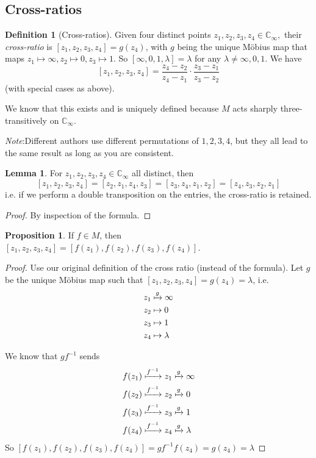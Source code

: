 \documentclass[a4paper]{article}
\theoremstyle{definition}
\newtheorem*{prop}{Proposition}
\newtheorem*{defi}{Definition}
\newtheorem*{lemma}{Lemma}
\newcommand{\note}{\noindent \emph{Note}:\;}
\newcommand{\C}{\mathbb{C}}
\begin{document}
\subsection{Cross-ratios}
\begin{defi}[Cross-ratios]
  Given four distinct points $z_1, z_2, z_3, z_4\in \C_\infty,$ their \emph{cross-ratio} is $[z_1, z_2, z_3, z_4] = g(z_4)$, with $g$ being the unique M\"obius map that maps $z_1\mapsto \infty, z_2\mapsto 0, z_3\mapsto 1$.  So $[\infty, 0, 1, \lambda] = \lambda$ for any $\lambda\not= \infty, 0, 1$. We have
  \[
  [z_1, z_2, z_3, z_4] = \frac{z_4 - z_2}{z_4 - z_1} \cdot \frac{z_3 - z_1}{z_3 - z_2}
  \]
(with special cases as above).
\end{defi}
We know that this exists and is uniquely defined because $M$ acts sharply three-transitively on $\C_\infty$.

\note Different authors use different permutations of $1, 2, 3, 4$, but they all lead to the same result as long as you are consistent.

\begin{lemma}
  For $z_1, z_2, z_3, z_4\in \C_\infty$ all distinct, then
  \[
  [z_1, z_2, z_3, z_4] = [z_2, z_1, z_4, z_3] = [z_3, z_4, z_1, z_2] = [z_4, z_3, z_2, z_1]
  \]
  i.e. if we perform a double transposition on the entries, the cross-ratio is retained.
\end{lemma}

\begin{proof}
  By inspection of the formula.
\end{proof}

\begin{prop}
  If $f\in M$, then $[z_1, z_2, z_3, z_4] = [f(z_1), f(z_2), f(z_3), f(z_4)]$.
\end{prop}

\begin{proof}
  Use our original definition of the cross ratio (instead of the formula). Let $g$ be the unique M\"obius map such that $[z_1, z_2, z_3, z_4] = g(z_4) = \lambda$, i.e.
  \begin{align*}
    z_1 &\xmapsto{g} \infty\\
    z_2 &\mapsto 0\\
    z_3 &\mapsto 1\\
    z_4 &\mapsto \lambda
  \end{align*}

  We know that $gf^{-1}$ sends
  \begin{align*}
    f(z_1)\xmapsto{f^{-1}} z_1 &\xmapsto{g} \infty\\
    f(z_2)\xmapsto{f^{-1}} z_2 &\xmapsto{g} 0\\
    f(z_3)\xmapsto{f^{-1}} z_3 &\xmapsto{g} 1\\
    f(z_4)\xmapsto{f^{-1}} z_4 &\xmapsto{g} \lambda
  \end{align*}
So $[f(z_1), f(z_2), f(z_3), f(z_4)] = gf^{-1}f(z_4) = g(z_4) = \lambda$
\end{proof}
\end{document}
